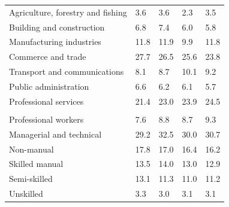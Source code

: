 \documentclass{article}
\begin{document}
\begin{table}[h]
\begin{tabular}{KTTTT}
    \hline
Agriculture, forestry and fishing  & 3.6& 3.6& 2.3& 3.5\\
Building and construction & 6.8& 7.4& 6.0& 5.8\\
Manufacturing industries & 11.8& 11.9&  9.9& 11.8\\
Commerce and trade  & 27.7& 26.5& 25.6& 23.8\\
Transport and communications  &  8.1&  8.7& 10.1&  9.2\\
Public administration & 6.6& 6.2& 6.1& 5.7\\
Professional services & 21.4& 23.0& 23.9& 24.5\\
\hline
    \\ 
    \hline
Professional workers  & 7.6& 8.8 & 8.7& 9.3\\
Managerial and technical & 29.2& 32.5& 30.0& 30.7\\
Non-manual & 17.8& 17.0& 16.4& 16.2\\
Skilled manual & 13.5& 14.0& 13.0& 12.9\\
Semi-skilled & 13.1& 11.3& 11.0& 11.2\\
Unskilled  & 3.3& 3.0& 3.1& 3.1\\
\end{tabular}
\end{table}
\pagebreak
\end{document}
